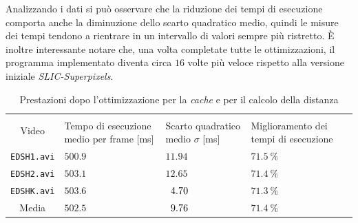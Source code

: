 \documentclass[12pt,a4paper,oneside]{article}
\begin{document}
\noindent Analizzando i dati si può osservare che la riduzione dei tempi di esecuzione comporta anche la diminuzione dello scarto quadratico medio, quindi le misure dei tempi tendono a rientrare in un intervallo di valori sempre più ristretto. È inoltre interessante notare che, una volta completate tutte le ottimizzazioni, il programma implementato diventa circa $16$ volte più veloce rispetto alla versione iniziale \textit{SLIC-Superpixels}.
\begin{table}[!htb]
	\renewcommand{\arraystretch}{1.3}
	\centering
	\begin{tabular}{|c||>{\centering\arraybackslash}m{}|>{\centering\arraybackslash}m{}|>{\centering\arraybackslash}m{}|}
	    \hline
		\multirow{2}{*}{\vspace{-6ex}Video}
		& \multicolumn{3}{c|}{VideoSLIC}\\\cline{2-4}
		& Tempo di esecuzione medio per frame [ms] & Scarto quadratico medio $\sigma$ [ms] & Miglioramento dei tempi di esecuzione\\
		\hline\hline
		\texttt{EDSH1.avi} & $500.9$ & $            11.94$ & $71.5~\%$ \\\hline
		\texttt{EDSH2.avi} & $503.1$ & $            12.65$ & $71.4~\%$ \\\hline
		\texttt{EDSHK.avi} & $503.6$ & $\hspace{.5em}4.70$ & $71.3~\%$ \\\hline\hline
		Media              & $502.5$ & $\hspace{.5em}9.76$ & $71.4~\%$ \\\hline
	\end{tabular}
	\captionsetup{justification=centering}
	\caption{Prestazioni dopo l'ottimizzazione per la \textit{cache} e per il calcolo della distanza}
	\label{EDSH_videos_perf_cache_distance}
\end{table}
\end{document}
